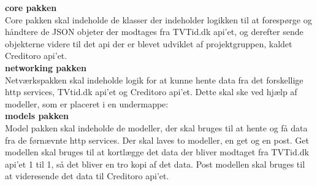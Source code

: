 \textbf{core pakken} \\
Core pakken skal indeholde de klasser der indeholder logikken til at forespørge og håndtere de JSON objeter der modtages fra TVTid.dk api'et, og derefter sende objekterne videre til det api der er blevet udviklet af projektgruppen, kaldet Creditoro api'et. \\

\textbf{networking pakken} \\
Netværkspakken skal indeholde logik for at kunne hente data fra det forskellige http services, TVtid.dk api'et og Creditoro api'et. Dette skal ske ved hjælp af modeller, som er placeret i en undermappe:\\

\textbf{models pakken} \\
Model pakken skal indeholde de modeller, der skal bruges til at hente og få data fra de førnævnte http services. Der skal laves to modeller, en get og en post. Get modellen skal bruges til at kortlægge det data der bliver modtaget fra TVTid.dk api'et 1 til 1, så det bliver en tro kopi af det data. Post modellen skal bruges til at videresende det data til Creditoro api'et.

